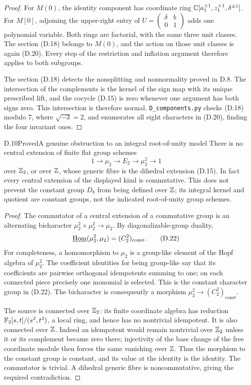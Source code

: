 \begin{proof}
For \(M(0)\), the identity component has coordinate ring
\(\mathbb C[a_1^{\pm1},z_1^{\pm1},\delta^{\pm1}]\).
For \(M[0]\), adjoining the upper-right entry of
\(U=\left(\begin{smallmatrix}\delta&b\\0&1\end{smallmatrix}\right)\)
adds one polynomial variable.  Both rings are factorial,
with the same three unit classes.  The section (D.18)
belongs to \(M(0)\), and the action on those unit classes
is again (D.20).  Every step of the restriction and
inflation argument therefore applies to both subgroups.

The section (D.18) detects the nonsplitting and nonnormality
proved in D.8.  The intersection of the complements is the
kernel of the sign map with its unique prescribed lift, and
the cocycle (D.15) is zero whenever one argument has both
signs zero.  This intersection is therefore normal.
\texttt{D\_components.py} checks (D.18) modulo \(7\), where
\(\sqrt{-3}=2\), and enumerates all eight characters in
(D.20), finding the four invariant ones.
\end{proof}

\begin{statement}{D.10}{Proved}{A genuine obstruction to an integral root-of-unity model}
There is no central extension of finite flat group schemes
\[
 1\longrightarrow\mu _2\longrightarrow E_2
   \longrightarrow\mu _2^2\longrightarrow1
 \tag{D.21}
\]
over \(\mathbb Z_2\), or over \(\mathbb Z\), whose generic fibre is the
dihedral extension (D.15).  In fact every central extension
of the displayed kind is commutative.
This does not prevent the constant group \(D_8\) from being
defined over \(\mathbb Z\); its integral kernel and quotient are
constant groups, not the indicated root-of-unity group schemes.
\end{statement}
\begin{proof}
The commutator of a central extension of a commutative group
is an alternating bicharacter
\(\mu _2^2\times\mu _2^2\to\mu _2\).
By diagonalizable-group duality,
\[
 \underline{\operatorname{Hom}}(\mu _2^2,\mu _2)=(C_2^2)_{\mathrm{const}}.
 \tag{D.22}
\]
For completeness, a homomorphism to \(\mu _2\) is a group-like
element of the Hopf algebra of \(\mu _2^2\).  The coefficient
identities for being group-like say that its coefficients
are pairwise orthogonal idempotents summing to one; on each
connected piece precisely one monomial is selected.  This
is the constant character group in (D.22).
The bicharacter is consequently a morphism
\(\mu _2^2\to(C_2^2)_{\mathrm{const}}\).

The source is connected over \(\mathbb Z_2\): its finite coordinate
algebra has reduction
\(\mathbb F_2[s,t]/(s^2,t^2)\), a local ring, and hence has no
nontrivial idempotent.  It is also connected over \(\mathbb Z\).
Indeed an idempotent would remain nontrivial over \(\mathbb Z_2\)
unless it or its complement became zero there; injectivity
of the base change of the free coordinate module then forces
the same vanishing over \(\mathbb Z\).
Thus the morphism to the constant group is constant, and its
value at the identity is the identity.  The commutator is
trivial.  A dihedral generic fibre is noncommutative, giving
the required contradiction.
\end{proof}

